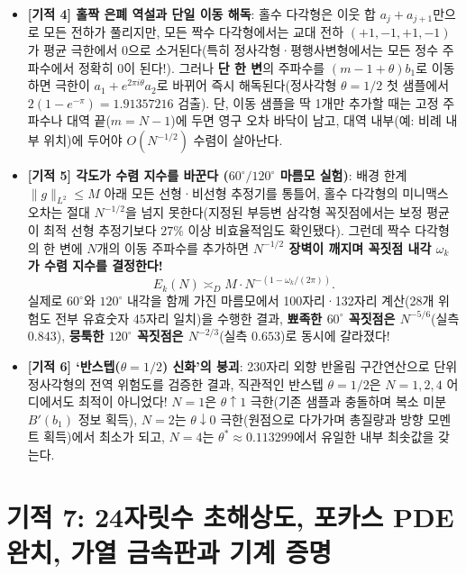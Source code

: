 \documentclass[11pt,a4paper]{article}
\begin{document}
\begin{itemize}
  \item \textbf{[기적 4] 홀짝 은폐 역설과 단일 이동 해독}: 홀수 다각형은 이웃 합 $a_j+a_{j+1}$만으로 모든 전하가 풀리지만, 모든 짝수 다각형에서는 교대 전하 $(+1,-1,+1,-1)$가 평균 극한에서 $0$으로 소거된다(특히 정사각형·평행사변형에서는 모든 정수 주파수에서 정확히 $0$이 된다!). 그러나 \textbf{단 한 변}의 주파수를 $(m-1+\theta)b_1$로 이동하면 극한이 $a_1 + e^{2\pi i\theta}a_2$로 바뀌어 즉시 해독된다(정사각형 $\theta=1/2$ 첫 샘플에서 $2(1-e^{-\pi}) = 1.91357216$ 검출). 단, 이동 샘플을 딱 1개만 추가할 때는 고정 주파수나 대역 끝($m=N-1$)에 두면 영구 오차 바닥이 남고, 대역 내부(예: 비례 내부 위치)에 두어야 $O(N^{-1/2})$ 수렴이 살아난다.
  \item \textbf{[기적 5] 각도가 수렴 지수를 바꾼다 ($60^\circ/120^\circ$ 마름모 실험)}: 배경 한계 $\|g\|_{L^2}\le M$ 아래 모든 선형·비선형 추정기를 통틀어, 홀수 다각형의 미니맥스 오차는 절대 \textbf{$N^{-1/2}$}을 넘지 못한다(지정된 부등변 삼각형 꼭짓점에서는 보정 평균이 최적 선형 추정기보다 $27\%$ 이상 비효율적임도 확인됐다). 그런데 짝수 다각형의 한 변에 $N$개의 이동 주파수를 추가하면 \textbf{$N^{-1/2}$ 장벽이 깨지며 꼭짓점 내각 $\omega_k$가 수렴 지수를 결정한다!}
  \begin{equation}
    E_k(N) \asymp_D M \cdot N^{-(1 - \omega_k/(2\pi))}.
  \end{equation}
  실제로 $60^\circ$와 $120^\circ$ 내각을 함께 가진 마름모에서 100자리·132자리 계산(28개 위험도 전부 유효숫자 45자리 일치)을 수행한 결과, \textbf{뾰족한 $60^\circ$ 꼭짓점은 $N^{-5/6}$}(실측 $0.843$), \textbf{뭉툭한 $120^\circ$ 꼭짓점은 $N^{-2/3}$}(실측 $0.653$)로 동시에 갈라졌다!
  \item \textbf{[기적 6] `반스텝($\theta=1/2$) 신화'의 붕괴}: 230자리 외향 반올림 구간연산으로 단위 정사각형의 전역 위험도를 검증한 결과, 직관적인 반스텝 $\theta=1/2$은 $N=1,2,4$ 어디에서도 최적이 아니었다! $N=1$은 $\theta\uparrow 1$ 극한(기존 샘플과 충돌하며 복소 미분 $B'(b_1)$ 정보 획득), $N=2$는 $\theta\downarrow 0$ 극한(원점으로 다가가며 총질량과 방향 모멘트 획득)에서 최소가 되고, $N=4$는 $\theta^* \approx 0.113299$에서 유일한 내부 최솟값을 갖는다.
\end{itemize}

\section{기적 7: 24자릿수 초해상도, 포카스 PDE 완치, 가열 금속판과 기계 증명}
\end{document}
